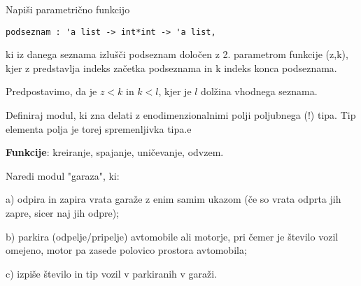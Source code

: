 \begin{ex}
Napi\v si parametri\v cno funkcijo 

\begin{verbatim}
podseznam : 'a list -> int*int -> 'a list, 
\end{verbatim}

ki iz danega seznama izlu\v s\v ci podseznam dolo\v cen z 2. parametrom funkcije (z,k), 
kjer z predstavlja indeks za\v cetka podseznama in k indeks konca podseznama. 

Predpostavimo, da je $z<k$ in $k<l$, kjer je $l$ dol\v zina vhodnega seznama. 

\end{ex} 

\begin{ex}
Definiraj modul, ki zna delati z enodimenzionalnimi polji poljubnega (!)
tipa. Tip elementa polja je torej spremenljivka tipa.e

\textbf{Funkcije}: kreiranje, spajanje, uni\v cevanje, odvzem.
\end{ex} 

\begin{ex}
Naredi modul "garaza", ki:

a) odpira in zapira vrata gara\v ze z enim samim ukazom (\v ce so vrata
odprta jih zapre, sicer naj jih odpre);

b) parkira (odpelje/pripelje) avtomobile ali motorje, pri \v cemer je
\v stevilo vozil omejeno, motor pa zasede polovico prostora avtomobila;

c) izpi\v se \v stevilo in tip vozil v parkiranih v gara\v zi.
\end{ex}

